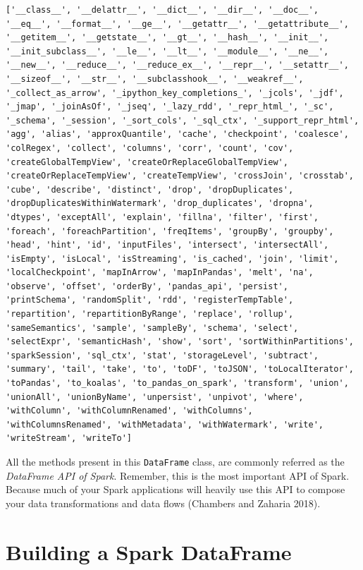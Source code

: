 \documentclass[
  11pt,
  letterpaper,
  DIV=11,
  numbers=noendperiod]{scrreprt}
\begin{document}
\begin{verbatim}
['__class__', '__delattr__', '__dict__', '__dir__', '__doc__', '__eq__', '__format__', '__ge__', '__getattr__', '__getattribute__', '__getitem__', '__getstate__', '__gt__', '__hash__', '__init__', '__init_subclass__', '__le__', '__lt__', '__module__', '__ne__', '__new__', '__reduce__', '__reduce_ex__', '__repr__', '__setattr__', '__sizeof__', '__str__', '__subclasshook__', '__weakref__', '_collect_as_arrow', '_ipython_key_completions_', '_jcols', '_jdf', '_jmap', '_joinAsOf', '_jseq', '_lazy_rdd', '_repr_html_', '_sc', '_schema', '_session', '_sort_cols', '_sql_ctx', '_support_repr_html', 'agg', 'alias', 'approxQuantile', 'cache', 'checkpoint', 'coalesce', 'colRegex', 'collect', 'columns', 'corr', 'count', 'cov', 'createGlobalTempView', 'createOrReplaceGlobalTempView', 'createOrReplaceTempView', 'createTempView', 'crossJoin', 'crosstab', 'cube', 'describe', 'distinct', 'drop', 'dropDuplicates', 'dropDuplicatesWithinWatermark', 'drop_duplicates', 'dropna', 'dtypes', 'exceptAll', 'explain', 'fillna', 'filter', 'first', 'foreach', 'foreachPartition', 'freqItems', 'groupBy', 'groupby', 'head', 'hint', 'id', 'inputFiles', 'intersect', 'intersectAll', 'isEmpty', 'isLocal', 'isStreaming', 'is_cached', 'join', 'limit', 'localCheckpoint', 'mapInArrow', 'mapInPandas', 'melt', 'na', 'observe', 'offset', 'orderBy', 'pandas_api', 'persist', 'printSchema', 'randomSplit', 'rdd', 'registerTempTable', 'repartition', 'repartitionByRange', 'replace', 'rollup', 'sameSemantics', 'sample', 'sampleBy', 'schema', 'select', 'selectExpr', 'semanticHash', 'show', 'sort', 'sortWithinPartitions', 'sparkSession', 'sql_ctx', 'stat', 'storageLevel', 'subtract', 'summary', 'tail', 'take', 'to', 'toDF', 'toJSON', 'toLocalIterator', 'toPandas', 'to_koalas', 'to_pandas_on_spark', 'transform', 'union', 'unionAll', 'unionByName', 'unpersist', 'unpivot', 'where', 'withColumn', 'withColumnRenamed', 'withColumns', 'withColumnsRenamed', 'withMetadata', 'withWatermark', 'write', 'writeStream', 'writeTo']
\end{verbatim}

All the methods present in this \texttt{DataFrame} class, are commonly
referred as the \emph{DataFrame API of Spark}. Remember, this is the
most important API of Spark. Because much of your Spark applications
will heavily use this API to compose your data transformations and data
flows (Chambers and Zaharia 2018).

\hypertarget{sec-building-a-dataframe}{%
\section{Building a Spark DataFrame}\label{sec-building-a-dataframe}}
\end{document}
